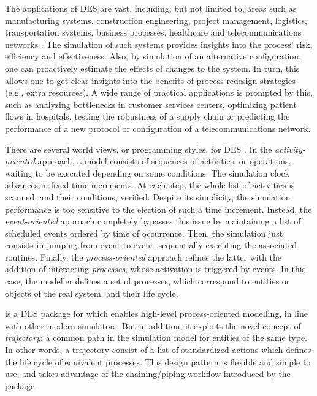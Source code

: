 \documentclass[
  nojss]{jss}
\begin{document}
The applications of DES are vast, including, but not limited to, areas
such as manufacturing systems, construction engineering, project
management, logistics, transportation systems, business processes,
healthcare and telecommunications networks \citep{Banks:2005:Discrete}.
The simulation of such systems provides insights into the process' risk,
efficiency and effectiveness. Also, by simulation of an alternative
configuration, one can proactively estimate the effects of changes to
the system. In turn, this allows one to get clear insights into the
benefits of process redesign strategies (e.g., extra resources). A wide
range of practical applications is prompted by this, such as analyzing
bottlenecks in customer services centers, optimizing patient flows in
hospitals, testing the robustness of a supply chain or predicting the
performance of a new protocol or configuration of a telecommunications
network.

There are several world views, or programming styles, for DES
\citep{Banks:2005:Discrete}. In the \emph{activity-oriented} approach, a
model consists of sequences of activities, or operations, waiting to be
executed depending on some conditions. The simulation clock advances in
fixed time increments. At each step, the whole list of activities is
scanned, and their conditions, verified. Despite its simplicity, the
simulation performance is too sensitive to the election of such a time
increment. Instead, the \emph{event-oriented} approach completely
bypasses this issue by maintaining a list of scheduled events ordered by
time of occurrence. Then, the simulation just consists in jumping from
event to event, sequentially executing the associated routines. Finally,
the \emph{process-oriented} approach refines the latter with the
addition of interacting \emph{processes}, whose activation is triggered
by events. In this case, the modeller defines a set of processes, which
correspond to entities or objects of the real system, and their life
cycle.

 \citep{CRAN:simmer} is a DES package for  which
enables high-level process-oriented modelling, in line with other modern
simulators. But in addition, it exploits the novel concept of
\emph{trajectory}: a common path in the simulation model for entities of
the same type. In other words, a trajectory consist of a list of
standardized actions which defines the life cycle of equivalent
processes. This design pattern is flexible and simple to use, and takes
advantage of the chaining/piping workflow introduced by the
 package \citep{CRAN:magrittr}.
\end{document}
